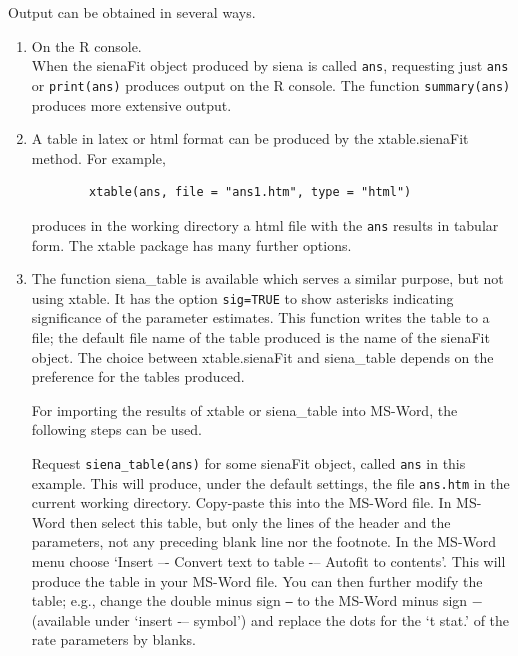 \documentclass[a4paper,fleqn,11pt]{article}
\newcommand{\+}{\, + \,}
\newcommand{\sfn}[1]{\textsf{#1}}
\newcommand{\R}{{\sf R }}
\begin{document}
Output can be obtained in several ways.
\begin{enumerate}
  \item On the \R console.\\
        When the \textsf{sienaFit} object produced by \textsf{siena}
        is called \texttt{ans},
        requesting just \texttt{ans} or \texttt{print(ans)}
        produces output on the \R console. The function
        \texttt{summary(ans)} produces more extensive output.
  \item A table in latex or html format can be produced by the
        \textsf{xtable.sienaFit} method.
        For example,
        \begin{verbatim}
        xtable(ans, file = "ans1.htm", type = "html")
        \end{verbatim}
        produces in the working directory a html file with the \texttt{ans}
        results in
        tabular form. The \textsf{xtable} package has many further options.\\
  \item The function \textsf{siena\_table}
        is available which serves a similar purpose,
        but not using \textsf{xtable}.
        It has the option \texttt{sig=TRUE} to show asterisks
        indicating significance of the parameter estimates.
        This function writes the table to a file;
        the default file name of the table produced is the name of the
        \sfn{sienaFit} object.
        The choice between \textsf{xtable.sienaFit} and \textsf{siena\_table}
        depends on the preference for the tables produced.

        For importing the results of \sfn{xtable} or \textsf{siena\_table} into
        MS-Word, the following steps can be used.

        Request \texttt{siena\_table(ans)} for some \sfn{sienaFit} object,
        called \texttt{ans} in this example. This will produce,
        under the default settings, the file \texttt{ans.htm} in the current
        working directory.
        Copy-paste this into the MS-Word file.
        In MS-Word then select this table, but
        only the lines of the header and the parameters, not any
        preceding blank line nor the footnote.
        In the MS-Word menu choose `Insert –- Convert text to table -–
        Autofit to contents'.
        This will produce the table in your MS-Word file.
        You can then further modify the table; e.g., change the double minus
        sign \texttt{--} to the MS-Word minus sign $ - $
        (available under `insert -– symbol') and replace the dots for the
        `t stat.' of the rate parameters by blanks.


\end{enumerate}
\end{document}
